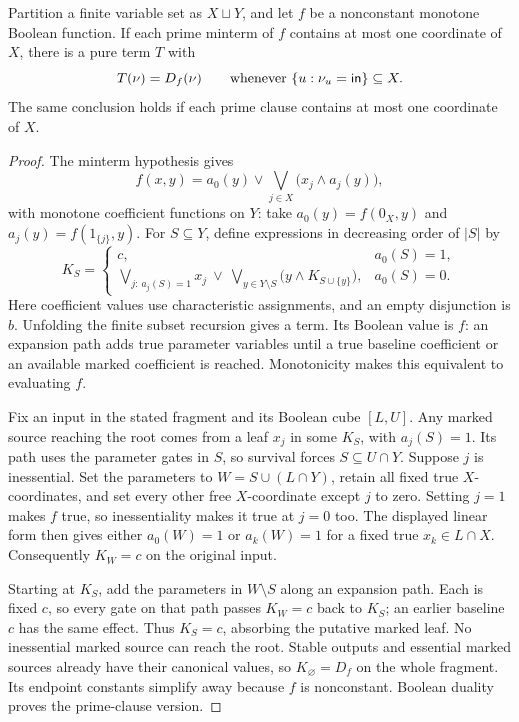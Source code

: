 \begin{theorem}
\label{core:thm:linear-marked-fragments}
Partition a finite variable set as $X\sqcup Y$, and let $f$ be a
nonconstant monotone Boolean function. If each prime minterm of $f$
contains at most one coordinate of $X$, there is a pure term $T$ with
\[
 T(\nu)=D_f(\nu)\qquad
 \text{whenever }\{u:\nu_u=\mathsf{in}\}\subseteq X.
\]
The same conclusion holds if each prime clause contains at most one
coordinate of $X$.
\end{theorem}
\begin{proof}
The minterm hypothesis gives
\[
 f(x,y)=a_0(y)\vee\bigvee_{j\in X}\bigl(x_j\wedge a_j(y)\bigr),
\]
with monotone coefficient functions on $Y$: take $a_0(y)=f(0_X,y)$
and $a_j(y)=f(1_{\{j\}},y)$. For $S\subseteq Y$, define expressions
in decreasing order of $|S|$ by
\begin{equation}\label{core:eq:linear-marked-expansion}
 K_S=
 \begin{cases}
 c,&a_0(S)=1,\\
 \displaystyle\bigvee_{j:\,a_j(S)=1}x_j\ \vee\
 \displaystyle\bigvee_{y\in Y\setminus S}
       \bigl(y\wedge K_{S\cup\{y\}}\bigr),&a_0(S)=0.
 \end{cases}
\end{equation}
Here coefficient values use characteristic assignments, and an empty
disjunction is $b$. Unfolding the finite subset recursion gives a term.
Its Boolean value is $f$: an expansion path adds true parameter variables
until a true baseline coefficient or an available marked coefficient
is reached. Monotonicity makes this equivalent to evaluating $f$.

Fix an input in the stated fragment and its Boolean cube $[L,U]$.
Any marked source reaching the root comes from a leaf $x_j$ in some
$K_S$, with $a_j(S)=1$. Its path uses the parameter gates in $S$, so
survival forces $S\subseteq U\cap Y$. Suppose $j$ is inessential.
Set the parameters to $W=S\cup(L\cap Y)$, retain all fixed true
$X$-coordinates, and set every other free $X$-coordinate except $j$ to
zero. Setting $j=1$ makes $f$ true, so inessentiality makes it true at
$j=0$ too. The displayed linear form then gives either $a_0(W)=1$ or
$a_k(W)=1$ for a fixed true $x_k\in L\cap X$.
Consequently $K_W=c$ on the original input.

Starting at $K_S$, add the parameters in $W\setminus S$ along an
expansion path. Each is fixed $c$, so every gate on that path passes
$K_W=c$ back to $K_S$; an earlier baseline $c$ has the same effect.
Thus $K_S=c$, absorbing the putative marked leaf. No inessential marked
source can reach the root. Stable outputs and essential marked sources
already have their canonical values, so $K_\varnothing=D_f$ on the
whole fragment. Its endpoint constants simplify away because $f$ is
nonconstant. Boolean duality proves the prime-clause version.
\end{proof}

